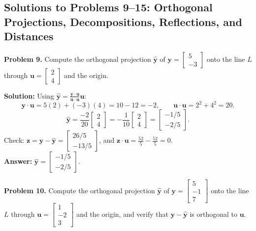 \documentclass[11pt, letterpaper]{article}
\theoremstyle{definition}
\theoremstyle{remark}
\begin{document}
\subsection{Solutions to Problems 9--15: Orthogonal Projections, Decompositions, Reflections, and Distances}

\textbf{Problem 9.} Compute the orthogonal projection $\hat{\mathbf{y}}$ of $\mathbf{y} = \begin{bmatrix} 5 \\ -3 \end{bmatrix}$ onto the line $L$ through $\mathbf{u} = \begin{bmatrix} 2 \\ 4 \end{bmatrix}$ and the origin.

\textbf{Solution:} Using $\hat{\mathbf{y}} = \frac{\mathbf{y} \cdot \mathbf{u}}{\mathbf{u} \cdot \mathbf{u}}\mathbf{u}$:
\[
\mathbf{y} \cdot \mathbf{u} = 5(2) + (-3)(4) = 10 - 12 = -2, \qquad
\mathbf{u} \cdot \mathbf{u} = 2^2 + 4^2 = 20.
\]
\[
\hat{\mathbf{y}} = \frac{-2}{20}\begin{bmatrix} 2 \\ 4 \end{bmatrix} = -\frac{1}{10}\begin{bmatrix} 2 \\ 4 \end{bmatrix} = \begin{bmatrix} -1/5 \\ -2/5 \end{bmatrix}.
\]
Check: $\mathbf{z} = \mathbf{y} - \hat{\mathbf{y}} = \begin{bmatrix} 26/5 \\ -13/5 \end{bmatrix}$, and $\mathbf{z} \cdot \mathbf{u} = \frac{52}{5} - \frac{52}{5} = 0$. \\
\textbf{Answer:} $\hat{\mathbf{y}} = \begin{bmatrix} -1/5 \\ -2/5 \end{bmatrix}$.

\textbf{Problem 10.} Compute the orthogonal projection $\hat{\mathbf{y}}$ of $\mathbf{y} = \begin{bmatrix} 5 \\ -1 \\ 7 \end{bmatrix}$ onto the line $L$ through $\mathbf{u} = \begin{bmatrix} 1 \\ -2 \\ 3 \end{bmatrix}$ and the origin, and verify that $\mathbf{y} - \hat{\mathbf{y}}$ is orthogonal to $\mathbf{u}$.
\end{document}
